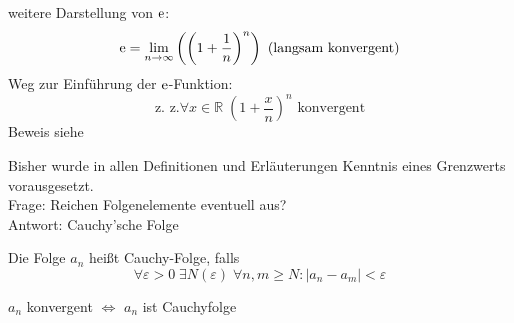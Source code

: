 %
\noindent weitere Darstellung von $\operatorname{e}$:
\begin{equation*}
  \operatorname{e} = \lim_{n \rightarrow \infty} \left( \left(1+\frac 1 n\right)^n \right)\text{ (langsam konvergent)}
\end{equation*}
%
Weg zur Einführung der $\operatorname{e}$-Funktion:
\begin{equation*}
  \text{z. z.} \forall x \in \mathbb{R}\; \left( 1 + \frac x n \right)^n \text{ konvergent}
\end{equation*}
Beweis siehe \cite[S. 32]{bornemann}

\begin{note}
  Bisher wurde in allen Definitionen und Erläuterungen Kenntnis eines Grenzwerts vorausgesetzt.\\
  Frage: Reichen Folgenelemente eventuell aus?\\
  Antwort: Cauchy'sche Folge
\end{note}

\begin{definition}
  Die Folge $a_n$ heißt Cauchy-Folge, falls
  \[ \forall \varepsilon > 0\; \exists N(\varepsilon)\; \forall n,m \geq N: \left| a_n-a_m \right| < \varepsilon \]
\end{definition}

\begin{proposition}
  $a_n$ konvergent $\Leftrightarrow$ $a_n$ ist Cauchyfolge
\end{proposition}

